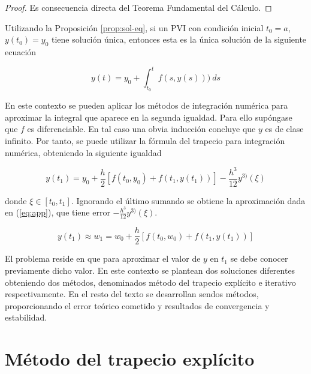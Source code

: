 \documentclass{article}
\theoremstyle{theorem-style}  %
\theoremstyle{definition}
\theoremstyle{example-style}
\begin{document}
	\begin{proof}
		Es consecuencia directa del Teorema Fundamental del Cálculo.
	\end{proof}

	
	Utilizando la Proposición \ref{prop:sol-eq}, si un PVI con condición inicial $t_0 = a$, $y(t_0) = y_0$ tiene solución única, entonces esta es la única solución de la siguiente ecuación
	
	\begin{equation}
		y(t)  = y_0 + \int_{t_0}^{t} f(s,y(s))) \ ds
	\end{equation}
	
	En este contexto se pueden aplicar los métodos de integración numérica para aproximar la integral que aparece en la segunda igualdad. Para ello supóngase que $f$ es diferenciable. En tal caso una obvia inducción concluye que $y$ es de clase infinito. Por tanto, se puede utilizar la fórmula del trapecio para integración numérica, obteniendo la siguiente igualdad
	
	\begin{equation} \label{eq:trapecio-igualdad}
		y(t_{1}) = y_0 + \frac{h}{2} \left[f(t_0,y_0) + f(t_1, y(t_1))\right] - \frac{h^3}{12}y^{3)}(\xi)
	\end{equation}


	donde $\xi \in [t_0, t_1]$. Ignorando el último sumando se obtiene la aproximación dada en (\ref{eq:app}), que tiene error $- \frac{h^3}{12}y^{3)}(\xi)$.

	\begin{equation} \label{eq:app}
		y(t_1) \approx w_1 = w_0 + \frac{h}{2} \left[f(t_0,w_0) + f(t_1, y(t_1))\right]
	\end{equation}

	El problema reside en que para aproximar el valor de $y$ en $t_1$ se debe conocer previamente dicho valor. En este contexto se plantean dos soluciones diferentes obteniendo dos métodos, denominados método del trapecio explícito e iterativo respectivamente. En el resto del texto se desarrollan sendos métodos, proporcionando el error teórico cometido y resultados de convergencia y estabilidad.
	

\section{Método del trapecio explícito}	 \label{sec:trapecio-explicito}
		
\end{document}
